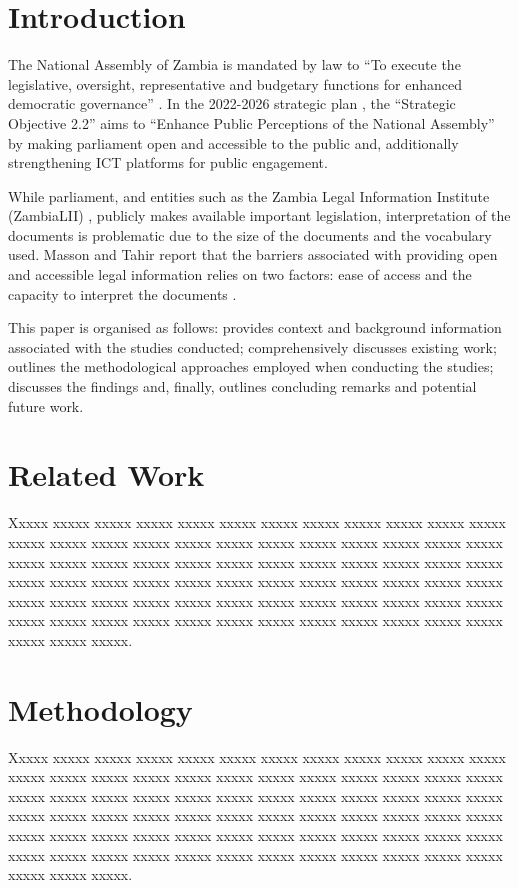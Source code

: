 \documentclass[conference]{IEEEtran}
\begin{document}
\section{Introduction}
\label{sec:introduction}
The National Assembly of Zambia is mandated by law to “To execute the legislative, oversight, representative and budgetary functions for enhanced democratic governance” \cite{NationalAssembly2023Objectives}. In the 2022-2026 strategic plan \cite{NationalAssembly2021Strategic}, the “Strategic Objective 2.2” aims to “Enhance Public Perceptions of the National Assembly” by making parliament open and accessible to the public and, additionally strengthening ICT platforms for public engagement.

While parliament, and entities such as the Zambia Legal Information Institute (ZambiaLII) \cite{ZambiaLII2024Website}, publicly makes available important legislation, interpretation of the documents is problematic due to the size of the documents and the vocabulary used. Masson and Tahir report that the barriers associated with providing open and accessible legal information relies on two factors: ease of access and the capacity to interpret the documents \cite{Masson2016Legal}.

This paper is organised as follows:  provides context and background information associated with the studies conducted;  comprehensively discusses existing work;  outlines the methodological approaches employed when conducting the studies;  discusses the findings and, finally,  outlines concluding remarks and potential future work.

\section{Related Work}
\label{sec:related_work}
Xxxxx xxxxx xxxxx  xxxxx  xxxxx  xxxxx  xxxxx  xxxxx  xxxxx  xxxxx  xxxxx  xxxxx  xxxxx  xxxxx  xxxxx  xxxxx  xxxxx  xxxxx  xxxxx  xxxxx  xxxxx  xxxxx  xxxxx  xxxxx  xxxxx  xxxxx  xxxxx  xxxxx  xxxxx  xxxxx  xxxxx  xxxxx  xxxxx  xxxxx  xxxxx  xxxxx  xxxxx  xxxxx  xxxxx  xxxxx  xxxxx  xxxxx  xxxxx  xxxxx  xxxxx  xxxxx  xxxxx  xxxxx  xxxxx  xxxxx  xxxxx  xxxxx  xxxxx  xxxxx  xxxxx  xxxxx  xxxxx  xxxxx  xxxxx  xxxxx  xxxxx  xxxxx  xxxxx  xxxxx  xxxxx  xxxxx  xxxxx  xxxxx  xxxxx  xxxxx  xxxxx  xxxxx  xxxxx  xxxxx  xxxxx.

\section{Methodology}
\label{sec:methodology}
Xxxxx xxxxx xxxxx  xxxxx  xxxxx  xxxxx  xxxxx  xxxxx  xxxxx  xxxxx  xxxxx  xxxxx  xxxxx  xxxxx  xxxxx  xxxxx  xxxxx  xxxxx  xxxxx  xxxxx  xxxxx  xxxxx  xxxxx  xxxxx  xxxxx  xxxxx  xxxxx  xxxxx  xxxxx  xxxxx  xxxxx  xxxxx  xxxxx  xxxxx  xxxxx  xxxxx  xxxxx  xxxxx  xxxxx  xxxxx  xxxxx  xxxxx  xxxxx  xxxxx  xxxxx  xxxxx  xxxxx  xxxxx  xxxxx  xxxxx  xxxxx  xxxxx  xxxxx  xxxxx  xxxxx  xxxxx  xxxxx  xxxxx  xxxxx  xxxxx  xxxxx  xxxxx  xxxxx  xxxxx  xxxxx  xxxxx  xxxxx  xxxxx  xxxxx  xxxxx  xxxxx  xxxxx  xxxxx  xxxxx  xxxxx.
\end{document}
